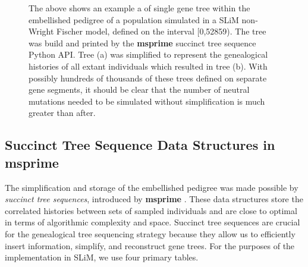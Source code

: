 \documentclass{article}
\begin{document}
\begin{figure}[!tbp]
   \begin{center}
  	\centering
  	\hfill
  	\caption{The above shows an example a of single gene tree
	within the embellished pedigree of 
	a population simulated in a SLiM non-Wright Fischer model, defined on the interval [0,52859).
	The tree was build and printed by the \textbf{msprime} succinct tree sequence Python API.
	Tree (a) was simplified to represent the genealogical histories of all extant individuals 
	which resulted in tree (b).
	With possibly hundreds of thousands of these trees defined on separate gene segments,
	it should be clear that the number of neutral mutations needed to be simulated without simplification is 
	much greater than after.
	}
   \end{center}
\end{figure}

\subsection{Succinct Tree Sequence Data Structures in msprime}

The simplification and storage of the embellished pedigree
was made possible by \textit{succinct tree sequences},
introduced by \textbf{msprime} \cite{Kelleher2016}.
These data structures store the correlated histories between sets of sampled individuals 
and are close to optimal in terms 
of algorithmic complexity and space.
Succinct tree sequences are crucial for the genealogical tree sequencing strategy 
because they allow us to efficiently insert information, simplify, and reconstruct gene trees.
For the purposes of the implementation in SLiM,
we use four primary tables.
\end{document}
